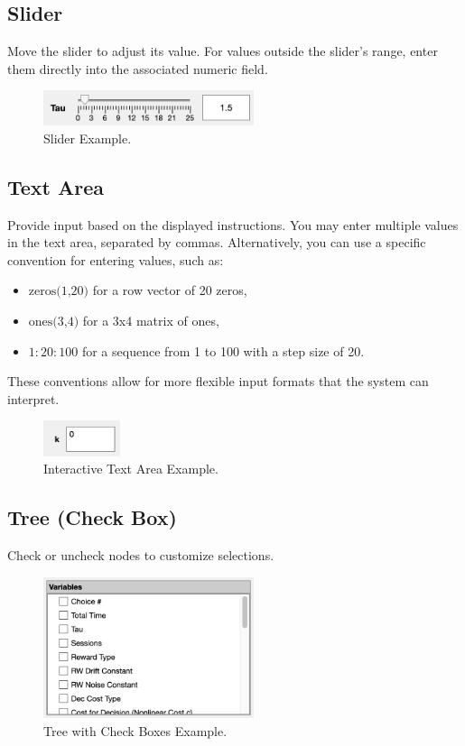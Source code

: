 \subsection{Slider}
Move the slider to adjust its value. For values outside the slider’s range, enter them directly into the associated numeric field.
\begin{figure}[H]
    \centering
    \includegraphics[width=0.55\textwidth]{figs/slider_image.png}
    \caption{Slider Example.}
    \label{fig:slider}
\end{figure}

\subsection{Text Area}\label{sec:text_area}
Provide input based on the displayed instructions. You may enter multiple values in the text area, separated by commas. Alternatively, you can use a specific convention for entering values, such as:
\begin{itemize}
    \item \( \text{zeros(1,20)} \) for a row vector of 20 zeros,
    \item \( \text{ones(3,4)} \) for a 3x4 matrix of ones,
    \item \( 1:20:100 \) for a sequence from 1 to 100 with a step size of 20.
\end{itemize}

These conventions allow for more flexible input formats that the system can interpret.

\begin{figure}[H]
    \centering
    \includegraphics[width=0.2\textwidth]{figs/text_area_image.png}
    \caption{Interactive Text Area Example.}
    \label{fig:text_area}
\end{figure}

\subsection{Tree (Check Box)}
Check or uncheck nodes to customize selections.
\begin{figure}[H]
    \centering
    \includegraphics[width=0.55\textwidth]{figs/tree_checkbox_image.png}
    \caption{Tree with Check Boxes Example.}
    \label{fig:tree_checkbox}
\end{figure}

